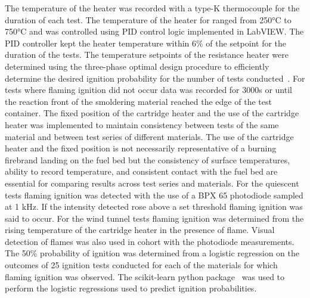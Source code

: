     The temperature of the heater was recorded with a type-K thermocouple for the duration of each test. The temperature of the heater for ranged from 250\si{\celsius} to 750\si{\celsius} and was controlled using PID control logic implemented in LabVIEW. The PID controller kept the heater temperature within 6\% of the setpoint for the duration of the tests. The temperature setpoints of the resistance heater were determined using the three-phase optimal design procedure to efficiently determine the desired ignition probability for the number of tests conducted~\cite{Wu2014}. For tests where flaming ignition did not occur data was recorded for 3000\si{\second} or until the reaction front of the smoldering material reached the edge of the test container. The fixed position of the cartridge heater and the use of the cartridge heater was implemented to maintain consistency between tests of the same material and between test series of different materials. The use of the cartridge heater and the fixed position is not necessarily representative of a burning firebrand landing on the fuel bed but the consistency of surface temperatures, ability to record temperature, and consistent contact with the fuel bed are essential for comparing results across test series and materials. For the quiescent tests flaming ignition was detected with the use of a BPX 65 photodiode sampled at 1 kHz. If the intensity detected rose above a set threshold flaming ignition was said to occur. For the wind tunnel tests flaming ignition was determined from the rising temperature of the cartridge heater in the presence of flame. Visual detection of flames was also used in cohort with the photodiode measurements. The 50\% probability of ignition was determined from a logistic regression on the outcomes of 25 ignition tests conducted for each of the materials for which flaming ignition was observed. The scikit-learn python package~\cite{scikit-learn} was used to perform the logistic regressions used to predict ignition probabilities.
